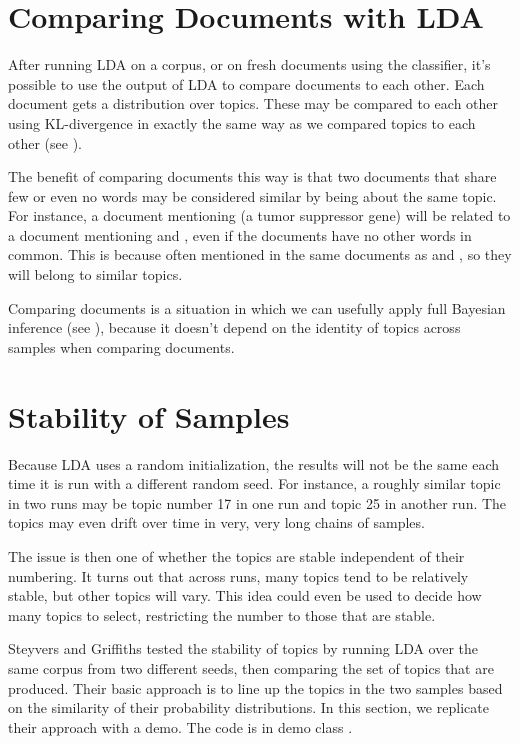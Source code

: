 \section{Comparing Documents with LDA}

After running LDA on a corpus, or on fresh documents using the
classifier, it's possible to use the output of LDA to compare
documents to each other.  Each document gets a distribution over
topics.  These may be compared to each other using KL-divergence in
exactly the same way as we compared topics to each other (see
).

The benefit of comparing documents this way is that two documents that
share few or even no words may be considered similar by being about
the same topic.  For instance, a document mentioning
 (a tumor suppressor gene) will be related to a
document mentioning  and
, even if the documents have no other words
in common.  This is because  often mentioned in the
same documents as  and
, so they will belong to similar topics.

Comparing documents is a situation in which we can usefully apply full
Bayesian inference (see ), because it
doesn't depend on the identity of topics across samples when comparing
documents.  


\section{Stability of Samples}\label{section:lda-stability}

Because LDA uses a random initialization, the results will not be the
same each time it is run with a different random seed.  For instance,
a roughly similar topic in two runs may be topic number 17 in one
run and topic 25 in another run.  The topics may even drift over time
in very, very long chains of samples.

The issue is then one of whether the topics are stable independent of
their numbering.  It turns out that across runs, many topics tend to
be relatively stable, but other topics will vary.  This idea could even
be used to decide how many topics to select, restricting the number to
those that are stable.

Steyvers and Griffiths tested the stability of topics by running LDA
over the same corpus from two different seeds, then comparing the set
of topics that are produced.  Their basic approach is to line up
the topics in the two samples based on the similarity of their
probability distributions.   In this section, we replicate their
approach with a demo.  The code is in demo class .

